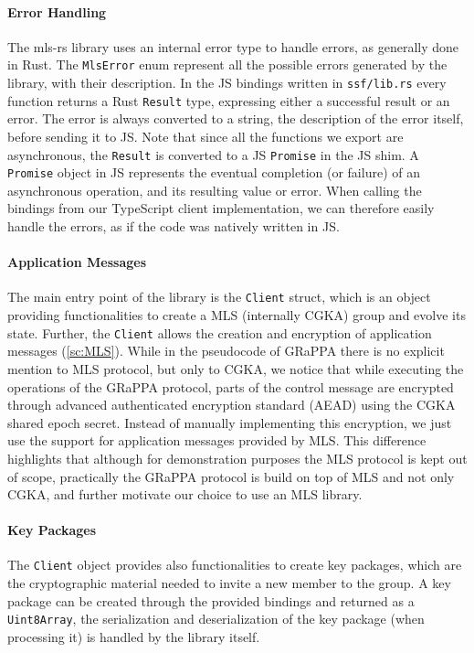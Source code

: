 \paragraph{Error Handling}
The mls-rs library uses an internal error type to handle errors, as generally
done in Rust. The \texttt{MlsError} enum represent all the possible errors generated
by the library, with their description.
In the JS bindings written in \texttt{ssf/lib.rs} every function returns a Rust
\texttt{Result} type, expressing either a successful result or an error.
The error is always converted to a string, the description of the error itself,
before sending it to JS. 
Note that since all the functions we export are asynchronous,
the \texttt{Result} is converted to a JS \texttt{Promise} in the JS shim.
A \texttt{Promise} object in JS represents the eventual completion (or failure) 
of an asynchronous operation, and its resulting value or error.
When calling the bindings from our TypeScript client implementation,
we can therefore easily handle the errors,
as if the code was natively written in JS.

\paragraph{Application Messages}
The main entry point of the library is the \texttt{Client} struct, which
is an object providing functionalities to create a MLS (internally CGKA)
group and evolve its state. Further, the \texttt{Client} allows the creation
and encryption of application messages (\cref{sc:MLS}). While in the pseudocode 
of GRaPPA there is no explicit mention to MLS protocol, but only to CGKA,
we notice that while executing the operations of the GRaPPA protocol,
parts of the control message are encrypted through advanced authenticated
encryption standard (AEAD) using the CGKA shared epoch secret.
Instead of manually implementing this encryption, we just use the
support for application messages provided by MLS. This difference highlights
that although for demonstration purposes the MLS protocol is kept out of scope,
practically the GRaPPA protocol is build on top of MLS and not only CGKA, 
and further motivate our choice to use an MLS library.

\paragraph{Key Packages}
The \texttt{Client} object provides also functionalities to create
key packages, which are the cryptographic material needed to invite
a new member to the group. A key package can be created through the provided
bindings and returned as a \texttt{Uint8Array}, the serialization and
deserialization of the key package (when processing it) is handled by the 
library itself. 


